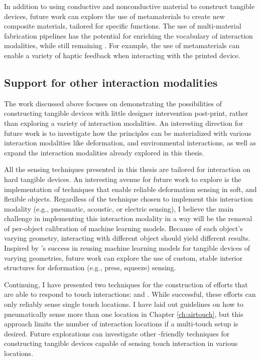       In addition to using conductive and nonconductive material to construct
      tangible devices, future work can explore the use of metamaterials to
      create new composite materials, tailored for specific functions.  The use
      of multi-material fabrication pipelines has the potential for enriching
      the vocabulary of interaction modalities, while still remaining \pap.  For
      example, the use of  metamaterials can enable a variety
      of haptic feedback when interacting with the printed device.

    \subsection{Support for other interaction modalities}
      The work discussed above focuses on demonstrating the possibilities of
      constructing tangible devices with little designer intervention
      post-print, rather than exploring a variety of interaction modalities. An
      interesting direction for future work is to investigate how the \papf
      principles can be materialized with various interaction modalities like
      deformation, and environmental interactions, as well as expand the
      interaction modalities already explored in this thesis.

      All the sensing techniques presented in this thesis are tailored for
      interaction on hard tangible devices. An interesting avenue for future
      work to explore is the implementation of \pap techniques that enable
      reliable deformation sensing in soft, and flexible objects. Regardless of
      the technique chosen to implement this interaction modality (e.g.,
      pneumatic, acoustic, or electric sensing), I believe the main challenge in
      implementing this interaction modality in a \pap way will be the removal
      of per-object calibration of machine learning models. Because of each
      object's varying geometry, interacting with different object should yield
      different results. Inspired by \at's success in reusing machine learning
      models for tangible devices of varying geometries, future work can explore
      the use of custom, stable interior structures for deformation (e.g.,
      press, squeeze) sensing.

      Continuing, I have presented two techniques for the construction of
      efforts that are able to respond to touch interactions: \at and \al. While
      successful, these efforts can only reliably sense single touch locations.
      I have laid out guidelines on how to pneumatically sense more than one
      location in Chapter \ref{ch:airtouch}, but this approach limits the number
      of interaction locations if a multi-touch setup is desired. Future
      explorations can investigate other \pap-friendly techniques for
      constructing tangible devices capable of sensing touch interaction in
      various locations.

